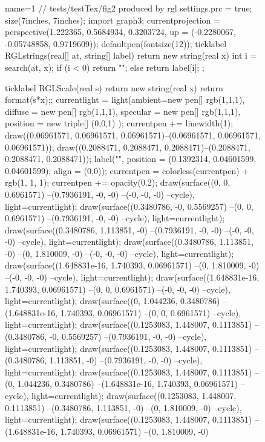 \documentclass{article}
\begin{document}
	\begin{figure}
		\centering
		\begin{asypicture}{name=1} %
// tests/testTex/fig2 produced by rgl
settings.prc = true;
size(7inches, 7inches);
import graph3;
currentprojection = perspective(1.222365, 0.5684934, 0.3203724, up = (-0.2280067, -0.05748858, 0.9719609));
defaultpen(fontsize(12));
ticklabel RGLstrings(real[] at, string[] label)
{
	return new string(real x) {
		int i = search(at, x);
		if (i < 0) return "";
		else return label[i];
	};
}

ticklabel RGLScale(real s)
{
	return new string(real x) {return format(s*x);};
}
currentlight = light(ambient=new pen[] {rgb(1,1,1)},
diffuse = new pen[] {rgb(1,1,1)},
specular = new pen[] {rgb(1,1,1)},
position = new triple[] {(0,0,1)}
);
currentpen += linewidth(1);
draw((0.06961571, 0.06961571, 0.06961571)--(0.06961571, 0.06961571, 0.06961571));
draw((0.2088471, 0.2088471, 0.2088471)--(0.2088471, 0.2088471, 0.2088471));
label("", position = (0.1392314, 0.04601599, 0.04601599), align = (0,0));
currentpen = colorless(currentpen) + rgb(1, 1, 1);
currentpen += opacity(0.2);
draw(surface((0, 0, 0.6961571)
--(0.7936191, -0, -0)
--(-0, -0, -0)
--cycle), light=currentlight);
draw(surface((0.3480786, -0, 0.5569257)
--(0, 0, 0.6961571)
--(0.7936191, -0, -0)
--cycle), light=currentlight);
draw(surface((0.3480786, 1.113851, -0)
--(0.7936191, -0, -0)
--(-0, -0, -0)
--cycle), light=currentlight);
draw(surface((0.3480786, 1.113851, -0)
--(0, 1.810009, -0)
--(-0, -0, -0)
--cycle), light=currentlight);
draw(surface((1.648831e-16, 1.740393, 0.06961571)
--(0, 1.810009, -0)
--(-0, -0, -0)
--cycle), light=currentlight);
draw(surface((1.648831e-16, 1.740393, 0.06961571)
--(0, 0, 0.6961571)
--(-0, -0, -0)
--cycle), light=currentlight);
draw(surface((0, 1.044236, 0.3480786)
--(1.648831e-16, 1.740393, 0.06961571)
--(0, 0, 0.6961571)
--cycle), light=currentlight);
draw(surface((0.1253083, 1.448007, 0.1113851)
--(0.3480786, -0, 0.5569257)
--(0.7936191, -0, -0)
--cycle), light=currentlight);
draw(surface((0.1253083, 1.448007, 0.1113851)
--(0.3480786, 1.113851, -0)
--(0.7936191, -0, -0)
--cycle), light=currentlight);
draw(surface((0.1253083, 1.448007, 0.1113851)
--(0, 1.044236, 0.3480786)
--(1.648831e-16, 1.740393, 0.06961571)
--cycle), light=currentlight);
draw(surface((0.1253083, 1.448007, 0.1113851)
--(0.3480786, 1.113851, -0)
--(0, 1.810009, -0)
--cycle), light=currentlight);
draw(surface((0.1253083, 1.448007, 0.1113851)
--(1.648831e-16, 1.740393, 0.06961571)
--(0, 1.810009, -0)

\end{asypicture}
\end{figure}
\end{document}
